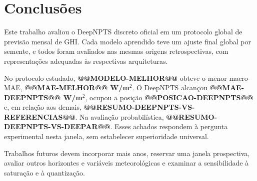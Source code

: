 \documentclass[10pt,conference,a4paper]{IEEEtran}
\begin{document}
\section{Conclusões}
\label{sec:conclusoes}

Este trabalho avaliou o DeepNPTS discreto oficial em um protocolo global de
previsão mensal de GHI. Cada modelo aprendido teve um ajuste final global por
semente, e todos foram avaliados nas mesmas origens retrospectivas, com
representações adequadas às respectivas arquiteturas.

No protocolo estudado, \textbf{@@MODELO-MELHOR@@} obteve o menor macro-MAE,
\textbf{@@MAE-MELHOR@@ W/m$^2$}. O DeepNPTS alcançou
\textbf{@@MAE-DEEPNPTS@@ W/m$^2$}, ocupou a posição
\textbf{@@POSICAO-DEEPNPTS@@} e, em relação aos demais,
\textbf{@@RESUMO-DEEPNPTS-VS-REFERENCIAS@@}. Na avaliação probabilística,
\textbf{@@RESUMO-DEEPNPTS-VS-DEEPAR@@}. Esses achados respondem à pergunta
experimental nesta janela, sem estabelecer superioridade universal.

Trabalhos futuros devem incorporar mais anos, reservar uma janela prospectiva,
avaliar outros horizontes e variáveis meteorológicas e examinar a sensibilidade
à saturação e à quantização.
\end{document}
